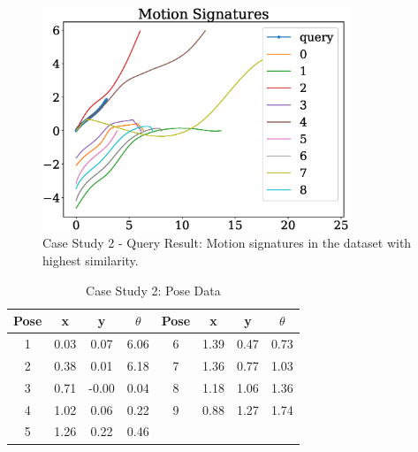 \documentclass[twocolumn,10pt]{asme2ej}
\begin{document}
\begin{figure}
\centering
\includegraphics[width=260pt]{figure/fig_ex_motion_signatures.eps}
  \caption{Case Study 2 - Query Result: Motion signatures in the dataset with highest similarity.}
\label{queryResult}
\end{figure}


\begin{table}
\caption{Case Study 2: Pose Data}
\centering
\label{poseData}
\begin{tabular}{cccccccc}
\hline
Pose & x & y & $\theta$ & Pose & x & y & $\theta$ \\
\hline
1 & 0.03 & 0.07 & 6.06 & 6 & 1.39 & 0.47 & 0.73 \\
2 & 0.38 & 0.01 & 6.18 & 7 & 1.36 & 0.77 & 1.03 \\
3 & 0.71 &-0.00 & 0.04 & 8 & 1.18 & 1.06 & 1.36 \\
4 & 1.02 & 0.06 & 0.22 & 9 & 0.88 & 1.27 & 1.74 \\
5 & 1.26 & 0.22 & 0.46 & \\
\end{tabular}
\end{table}
\end{document}
